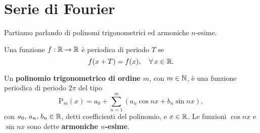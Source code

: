 \documentclass[../../analisi2]{subfiles}
\begin{document}
    \chapter{Serie di Fourier}

        Partiamo parlando di polinomi trigonometrici ed armoniche \(n\)-esime.

        \begin{definizione}
            Una funzione \(f : \mathbb{R} \to \mathbb{R}\) è periodica di periodo \(T\) se
            \[
                f(x + T) = f(x), \quad \forall \, x \in \mathbb{R}.
            \]
        \end{definizione}

        \begin{definizione}
            Un \textbf{polinomio trigonometrico di ordine \(m\)}, con \(m \in \mathbb{N}\), è una funzione periodica di periodo \(2 \pi\) del
            tipo
            \[
                \mathrm{P}_m (x) = a_0 + \sum_{n = 1}^m (a_n \cos nx + b_n \sin nx),
            \]
            con \(a_0, \, a_n, \, b_n \in \mathbb{R}\), detti coefficienti del polinomio, e \(x \in \mathbb{R}\). Le funzioni \(\cos nx\) e \(\sin nx\)
            sono dette \textbf{armoniche \(n\)-esime}.
        \end{definizione}
\end{document}
